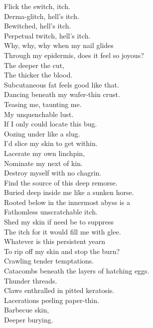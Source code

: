 
Flick the switch,  itch. \\
Derma-glitch, hell's itch. \\
Bewitched, hell's itch. \\
Perpetual twitch, hell's itch. \\

Why, why, why when my nail glides \\
Through my epidermis, does it feel so joyous? \\
The deeper the cut, \\
The thicker the blood. \\
Subcutaneous fat feels good like that. \\
Dancing beneath my wafer-thin crust. \\
Teasing me, taunting me. \\
My unquenchable lust. \\

If I only could locate this bug. \\
Oozing under like a slug. \\
I'd slice my skin to get within. \\
Lacerate my own linchpin, \\
Nominate my next of kin. \\
Destroy myself with no chagrin. \\
Find the source of this deep remorse. \\
Buried deep inside me like a sunken horse. \\
Rooted below in the innermost abyss is a \\
Fathomless unscratchable itch. \\

Shed my skin if need be to suppress \\
The itch for it would fill me with glee. \\
Whatever is this persistent yearn \\
To rip off my skin and stop the burn? \\
Crawling tender temptations. \\
Catacombs beneath the layers of hatching eggs. \\
Thunder threads. \\
Claws enthralled in pitted keratosis. \\
Lacerations peeling paper-thin. \\
Barbecue skin, \\
Deeper burying. \\

